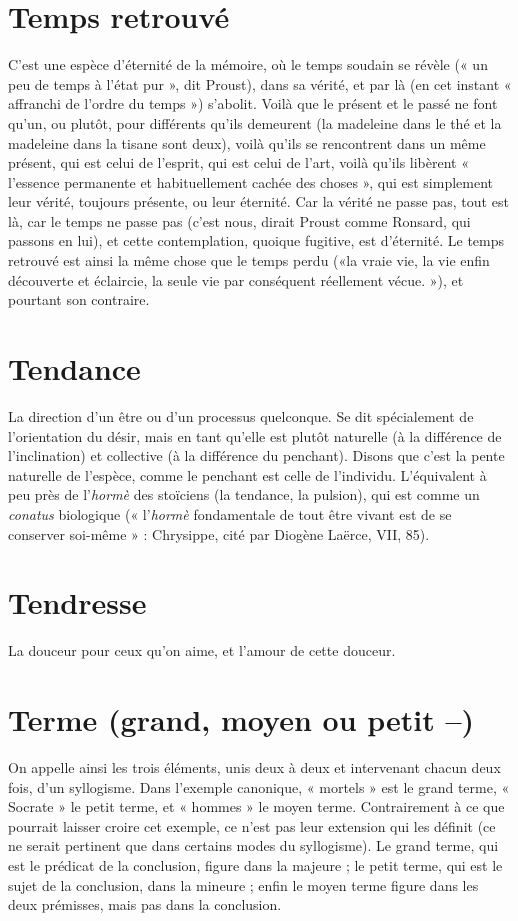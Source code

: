 \section{Temps retrouvé}
C’est une espèce d’éternité de la mémoire, où le temps
soudain se révèle (« un peu de temps à l’état pur », dit
Proust), dans sa vérité, et par là (en cet instant « affranchi de l’ordre du
temps ») s’abolit. Voilà que le présent et le passé ne font qu’un, ou plutôt, pour
différents qu’ils demeurent (la madeleine dans le thé et la madeleine dans la
tisane sont deux), voilà qu’ils se rencontrent dans un même présent, qui est
celui de l'esprit, qui est celui de l’art, voilà qu’ils libèrent « l’essence permanente
et habituellement cachée des choses », qui est simplement leur vérité, toujours
présente, ou leur éternité. Car la vérité ne passe pas, tout est là, car le temps ne
passe pas (c’est nous, dirait Proust comme Ronsard, qui passons en lui), et cette
contemplation, quoique fugitive, est d’éternité. Le temps retrouvé est ainsi la
même chose que le temps perdu («la vraie vie, la vie enfin découverte et
éclaircie, la seule vie par conséquent réellement vécue. »), et pourtant son
contraire.

\section{Tendance}
La direction d’un être ou d’un processus quelconque. Se dit
spécialement de l'orientation du désir, mais en tant qu’elle est
plutôt naturelle (à la différence de l’inclination) et collective (à la différence du
penchant). Disons que c’est la pente naturelle de l’espèce, comme le penchant
est celle de l’individu. L’équivalent à peu près de l’{\it hormè} des stoïciens (la tendance,
la pulsion), qui est comme un {\it conatus} biologique (« l’{\it hormè} fondamentale
de tout être vivant est de se conserver soi-même » : Chrysippe, cité par
Diogène Laërce, VII, 85).

\section{Tendresse}
La douceur pour ceux qu’on aime, et l’amour de cette douceur.

\section{Terme (grand, moyen ou petit {\bf --})}
On appelle ainsi les trois éléments,
unis deux à deux et
intervenant chacun deux fois, d’un syllogisme. Dans l’exemple canonique,
« mortels » est le grand terme, « Socrate » le petit terme, et « hommes » le moyen
terme. Contrairement à ce que pourrait laisser croire cet exemple, ce n’est pas leur
extension qui les définit (ce ne serait pertinent que dans certains modes du syllogisme).
Le grand terme, qui est le prédicat de la conclusion, figure dans la
majeure ; le petit terme, qui est le sujet de la conclusion, dans la mineure ; enfin
le moyen terme figure dans les deux prémisses, mais pas dans la conclusion.

